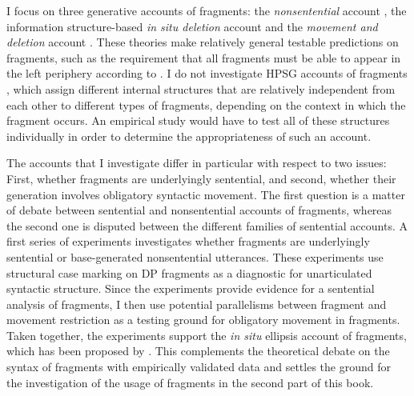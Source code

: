 I focus on three generative accounts of fragments: the \textit{nonsentential} account \citep[e.g.][]{barton.progovac2005, progovac2006}, the information structure-based \textit{in situ deletion} account \citep{reich2007, ott.struckmeier2016} and the \textit{movement and deletion} account \citep{merchant2004, weir2014}. These theories make relatively general testable predictions on fragments, such as the requirement that all fragments must be able to appear in the left periphery according to \citet{merchant2004}. I do not investigate HPSG accounts of fragments \citep{ginzburg.sag2000, fernandez.ginzburg2002, schlangen2003}, which assign different internal structures that are relatively independent from each other to different types of fragments, depending on the context in which the fragment occurs. An empirical study would have to test all of these structures individually in order to determine the appropriateness of such an account.

The accounts that I investigate differ in particular with respect to two issues: First, whether fragments are underlyingly sentential, and second, whether their generation involves obligatory syntactic movement. The first question is a matter of debate between sentential and nonsentential accounts of fragments, whereas the second one is disputed between the different families of sentential accounts. A first series of experiments investigates whether fragments are underlyingly sentential or base-generated nonsentential utterances. These experiments use structural case marking on DP fragments as a diagnostic for unarticulated syntactic structure. Since the experiments provide evidence for a sentential analysis of fragments, I then use potential parallelisms between fragment and movement restriction as a testing ground for obligatory movement in fragments. Taken together, the experiments support the \textit{in situ} ellipsis account of fragments, which has been proposed by \citet{reich2007}. This complements the theoretical debate on the syntax of fragments with empirically validated data and settles the ground for the investigation of the usage of fragments in the second part of this book.

